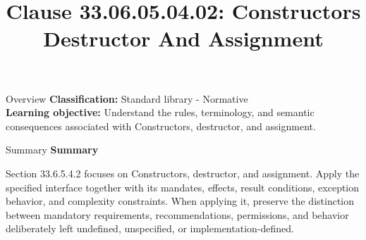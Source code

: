 \documentclass[10pt,letterpaper]{article}
\title{Clause 33.06.05.04.02: Constructors Destructor And Assignment}
\author{}
\date{}
\begin{document}
\maketitle
\begin{CornellOverviewBox}{Overview}
\textbf{Classification:} Standard library - Normative\\[2pt]
\textbf{Learning objective:} Understand the rules, terminology, and semantic consequences associated with Constructors, destructor, and assignment.
\end{CornellOverviewBox}\begin{CornellSummaryBox}{Summary}
{\sffamily\bfseries\color{Accent} Summary}\par\vspace{3pt}Section 33.6.5.4.2 focuses on Constructors, destructor, and assignment. Apply the specified interface together with its mandates, effects, result conditions, exception behavior, and complexity constraints. When applying it, preserve the distinction between mandatory requirements, recommendations, permissions, and behavior deliberately left undefined, unspecified, or implementation-defined.
\end{CornellSummaryBox}
\end{document}
